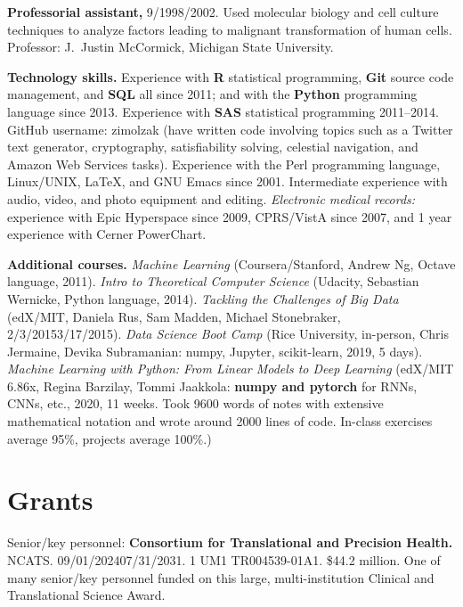 \documentclass[10pt]{article}
\begin{document}
\textbf{Professorial assistant,} 9/1998/2002. Used molecular
biology and cell culture techniques to analyze factors leading to
malignant transformation of human cells. Professor: J.\ Justin
McCormick, Michigan State University.

\textbf{Technology skills.} Experience with \textbf{R} statistical
programming, \textbf{Git} source code management, and \textbf{SQL} all
since 2011; and with the \textbf{Python} programming language since
2013. Experience with \textbf{SAS} statistical programming 2011--2014.
GitHub username: zimolzak (have written code involving topics such as
a Twitter text generator, cryptography, satisfiability solving,
celestial navigation, and Amazon Web Services tasks). Experience with
the Perl programming language, Linux/UNIX, \LaTeX, and GNU Emacs since
2001. Intermediate experience with audio, video, and photo equipment
and editing. \emph{Electronic medical records:} experience with Epic
Hyperspace since 2009, CPRS/VistA since 2007, and 1 year experience
with Cerner PowerChart.

\textbf{Additional courses.} \emph{Machine Learning}
(Coursera/Stanford, Andrew Ng, Octave language, 2011). \emph{Intro to
Theoretical Computer Science} (Udacity, Sebastian Wernicke, Python
language, 2014). \emph{Tackling the Challenges of Big Data} (edX/MIT,
Daniela Rus, Sam Madden, Michael Stonebraker,
2/3/2015\ndash{}3/17/2015). \emph{Data Science Boot Camp} (Rice
University, in-person, Chris Jermaine, Devika Subramanian: numpy,
Jupyter, scikit-learn, 2019, 5 days). \emph{Machine Learning with
Python: From Linear Models to Deep Learning} (edX/MIT 6.86x, Regina
Barzilay, Tommi Jaakkola: \textbf{numpy and pytorch} for RNNs, CNNs,
etc., 2020, 11 weeks. Took 9600 words of notes with extensive
mathematical notation and wrote around 2000 lines of code. In-class
exercises average 95\%, projects average 100\%.)




\section*{Grants}



Senior/key personnel: \textbf{Consortium for Translational and
  Precision Health.} NCATS. 09/01/2024\ndash{}07/31/2031. 1 UM1
TR004539-01A1. \$44.2 million. One of many senior/key personnel funded
on this large, multi-institution Clinical and Translational Science
Award.
\end{document}
